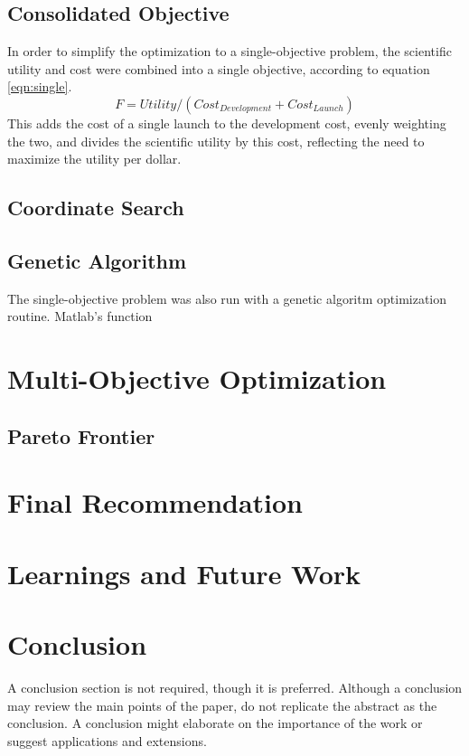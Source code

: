 \documentclass[]{aiaa-pretty}
\begin{document}
\subsection{Consolidated Objective}
In order to simplify the optimization to a single-objective problem, the scientific utility and cost were combined into a single objective, according to equation \ref{eqn:single}.
\begin{equation}
F = Utility/(Cost_{Development}+Cost_{Launch})
\label{eqn:single}
\end{equation}
This adds the cost of a single launch to the development cost, evenly weighting the two, and divides the scientific utility by this cost, reflecting the need to maximize the utility per dollar.
\subsection{Coordinate Search}

\subsection{Genetic Algorithm}

The single-objective problem was also run with a genetic algoritm optimization routine. Matlab's  function


\section{Multi-Objective Optimization}
\label{sec:multi}

\subsection{Pareto Frontier}


\section{Final Recommendation}


\section{Learnings and Future Work} 

\section{Conclusion}
A conclusion section is not required, though it is preferred. Although a conclusion may review the main points of the paper, do not replicate the abstract as the conclusion. A conclusion might elaborate on the importance of the work or suggest applications and extensions. 
\end{document}

